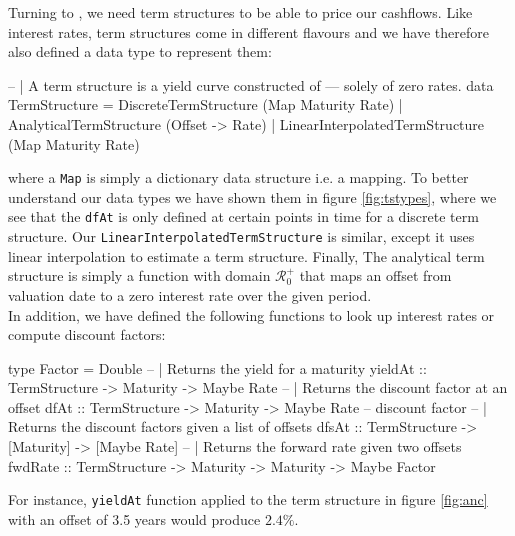 Turning to \hql, we need term structures to be able to price our cashflows.
Like interest rates, term structures come in different flavours and we 
have therefore also defined a data type to represent them:

\begin{hscode}
-- | A term structure is a yield curve constructed of
--- solely of zero rates.
data TermStructure = DiscreteTermStructure (Map Maturity Rate)
                   | AnalyticalTermStructure (Offset -> Rate)
                   | LinearInterpolatedTermStructure (Map Maturity Rate)
\end{hscode}

where a \texttt{Map} is simply a dictionary data structure i.e. a mapping.
To better understand our data types we have shown them in figure \ref{fig:tstypes},
where we see that the \texttt{dfAt} is only defined at certain points in time for
a discrete term structure. Our \texttt{LinearInterpolatedTermStructure} is similar,
except it uses linear interpolation to estimate a term structure.
Finally, The analytical term structure is simply a function with domain $\mathcal{R}^+_0$
that maps an offset from valuation date to a zero interest rate over the given
period.\\

In addition, we have defined the following functions to look up interest rates
or compute discount factors:

\begin{hscode}
type Factor = Double
-- | Returns the yield for a maturity
yieldAt :: TermStructure -> Maturity -> Maybe Rate
-- | Returns the discount factor at an offset
dfAt :: TermStructure -> Maturity -> Maybe Rate -- discount factor
-- | Returns the discount factors given a list of offsets
dfsAt :: TermStructure -> [Maturity] -> [Maybe Rate]
-- | Returns the forward rate given two offsets
fwdRate :: TermStructure -> Maturity -> Maturity -> Maybe Factor
\end{hscode}

For instance, \texttt{yieldAt} function applied to the term structure in
figure \ref{fig:anc} with an offset of 3.5 years would produce $2.4\%$.

